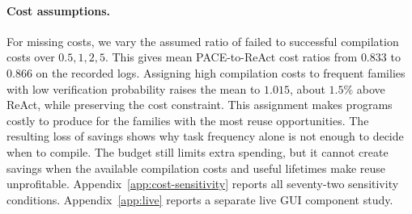 \paragraph{Cost assumptions.}
For missing costs, we vary the assumed ratio of failed to successful compilation costs over $0.5,1,2,5$.
This gives mean PACE-to-ReAct cost ratios from $0.833$ to $0.866$ on the recorded logs.
Assigning high compilation costs to frequent families with low verification probability raises the mean to $1.015$, about $1.5\%$ above ReAct, while preserving the cost constraint.
This assignment makes programs costly to produce for the families with the most reuse opportunities.
The resulting loss of savings shows why task frequency alone is not enough to decide when to compile.
The budget still limits extra spending, but it cannot create savings when the available compilation costs and useful lifetimes make reuse unprofitable.
Appendix~\ref{app:cost-sensitivity} reports all seventy-two sensitivity conditions.
Appendix~\ref{app:live} reports a separate live GUI component study.
